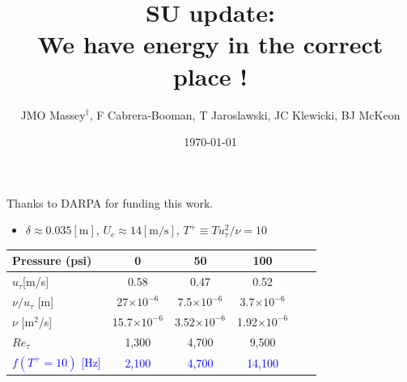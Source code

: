 \documentclass[aspectratio=169,9pt]{beamer}
\title{SU update: \\ We have energy in the correct place !}
\author{JMO Massey$^{\dag}$, F Cabrera-Booman, T Jaroslawski, JC Klewicki, BJ McKeon}
\institute{Center for Turbulence Research \\ Stanford University}
\date{\today}
\begin{document}
\begin{frame}
    \setcounter{framenumber}{0}
    \titlepage
    \vfill
    {\scriptsize \centering Thanks to DARPA for funding this work.\par}
\end{frame}

\begin{frame}

    \begin{itemize}
        \item $\delta\approx 0.035[\mathrm{m}]$, $U_e \approx14[\mathrm{m/s}]$, $T^+\equiv T u_\tau^2/\nu=10$
    \end{itemize}
    \begin{table}[]
        \centering
        \begin{tabular}{lccccc}
        \toprule
        Pressure (psi) & 0  &  50 & 100 \\
        \midrule
        $u_\tau$[m/s] & 0.58 & 0.47 & 0.52 \\
        $\nu/u_\tau$ [m] & 27$\times 10^{-6}$ & 7.5$\times 10^{-6}$ & 3.7$\times 10^{-6}$ \\
        $\nu$ [m$^2$/s] & 15.7$\times 10^{-6}$ & 3.52$\times 10^{-6}$ & 1.92$\times 10^{-6}$ \\
        $Re_\tau$ & 1,300 & 4,700 & 9,500 \\
        \textcolor{blue}{$f(T^+=10)$ [Hz]} & \textcolor{blue}{2,100} & \textcolor{blue}{4,700} & \textcolor{blue}{14,100} \\
        \bottomrule
        \end{tabular}
    \end{table}

\end{frame}
\end{document}
